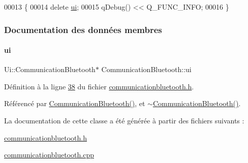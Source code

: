 \begin{DoxyCode}
00013 \{
00014     \textcolor{keyword}{delete} \hyperlink{class_communication_bluetooth_a2721cf9f9503a98770981ffdad09f9a1}{ui};
00015     qDebug() << Q\_FUNC\_INFO;
00016 \}
\end{DoxyCode}


\subsubsection{Documentation des données membres}
\mbox{\label{class_communication_bluetooth_a2721cf9f9503a98770981ffdad09f9a1}} 
\paragraph{\texorpdfstring{ui}{ui}}
{\footnotesize\ttfamily Ui\+::\+Communication\+Bluetooth$\ast$ Communication\+Bluetooth\+::ui\hspace{0.3cm}{\ttfamily [private]}}



Définition à la ligne \hyperlink{communicationbluetooth_8h_source_l00038}{38} du fichier \hyperlink{communicationbluetooth_8h_source}{communicationbluetooth.\+h}.



Référencé par \hyperlink{communicationbluetooth_8cpp_source_l00004}{Communication\+Bluetooth()}, et \hyperlink{communicationbluetooth_8cpp_source_l00012}{$\sim$\+Communication\+Bluetooth()}.



La documentation de cette classe a été générée à partir des fichiers suivants \+:\begin{DoxyCompactItemize}
\item 
\hyperlink{communicationbluetooth_8h}{communicationbluetooth.\+h}\item 
\hyperlink{communicationbluetooth_8cpp}{communicationbluetooth.\+cpp}\end{DoxyCompactItemize}
